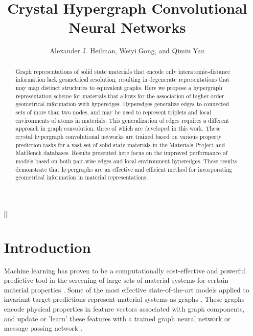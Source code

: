 \documentclass[twoside,twocolumn,9pt]{article}
\begin{document}
\title{Crystal Hypergraph Convolutional Neural Networks}

\author{Alexander J. Heilman, Weiyi Gong, and Qimin Yan}
 
\maketitle
 
[\@twocolumn]
 
\begin{abstract}
 	Graph representations of solid state materials that encode only interatomic-distance information lack geometrical resolution, resulting in degenerate representations that may map distinct structures to equivalent graphs. Here we propose a hypergraph representation scheme for materials that allows for the association of higher-order geometrical information with hyperedges. Hyperedges generalize edges to connected sets of more than two nodes, and may be used to represent triplets and local environments of atoms in materials. This generalization of edges requires a different approach in graph convolution, three of which are developed in this work. These crystal hypergraph convolutional networks are trained based on various property prediction tasks for a vast set of solid-state materials in the Materials Project and MatBench databases. Results presented here focus on the improved performance of models based on both pair-wise edges and local environment hyperedges. These results demonstrate that hypergraphs are an effective and efficient method for incorporating geometrical information in material representations.
\end{abstract}



\section{Introduction}
Machine learning has proven to be a computationally cost-effective and powerful predictive tool in the screening of large sets of material systems for certain material properties \cite{mlcite1, mlreview1, mlreview2, mlreview3}. Some of the most effective state-of-the-art models applied to invariant target predictions represent material systems as graphs \cite{schnet, cgcnn, megnet, chemgnn, geocgcnn, icgcnn}. These graphs encode physical properties in feature vectors associated with graph components, and update or 'learn' these features with a trained graph neural network or message passing network \cite{mpnn}. 
\end{document}
